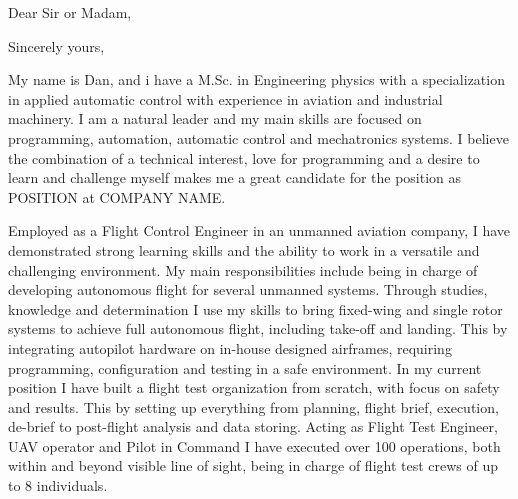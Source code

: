 \documentclass[12pt,a4paper,sans]{moderncv} %
\begin{document}
%
%



\clearpage

\date{\today} %
\opening{Dear Sir or Madam,} %
\closing{Sincerely yours,} %

\makelettertitle %

My name is Dan, and i have a M.Sc. in Engineering physics with a specialization in applied automatic control with experience in aviation and industrial machinery.
I am a natural leader and my main skills are focused on programming, automation, automatic control and mechatronics systems.
I believe the combination of a technical interest, love for programming and a desire to learn and challenge myself makes me a great candidate for the position as POSITION at COMPANY NAME.


Employed as a Flight Control Engineer in an unmanned aviation company, I have demonstrated strong learning skills and the ability to work in a versatile and challenging environment. 
My main responsibilities include being in charge of developing autonomous flight for several unmanned systems. 
Through studies, knowledge and determination I use my skills to bring fixed-wing and single rotor systems to achieve full autonomous flight, including take-off and landing. 
This by integrating autopilot hardware on in-house designed airframes, requiring programming, configuration and testing in a safe environment.
\newline
In my current position I have built a flight test organization from scratch, with focus on safety and results. 
This by setting up everything from planning, flight brief, execution, de-brief to post-flight analysis and data storing. Acting as Flight Test Engineer, UAV operator and Pilot in Command I have executed over 100 operations, both within and beyond visible line of sight, being in charge of flight test crews of up to 8 individuals.
\end{document}
